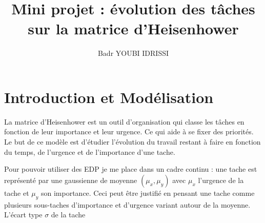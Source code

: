 \documentclass[french]{article}
\author{Badr YOUBI IDRISSI}
\title{Mini projet : évolution des tâches sur la matrice d'Heisenhower}
\begin{document}
\maketitle
\section{Introduction et Modélisation}

    La matrice d'Heisenhower est un outil d'organisation qui classe les tâches en fonction de leur 
    importance et leur urgence. Ce qui aide à se fixer des priorités. Le but de ce modèle est d'étudier
    l'évolution du travail restant à faire en fonction du temps, de l'urgence et de l'importance d'une tache.
    
    Pour pouvoir utiliser des EDP je me place dans un cadre continu : une tache est représenté par 
    une gaussienne de moyenne $(\mu_x,\mu_y)$ avec $\mu_x$ l'urgence de la tache et $\mu_y$ son importance.
    Ceci peut être justifié en pensant une tache comme plusieurs sous-taches d'importance et d'urgence variant
    autour de la moyenne. L'écart type $\sigma$ de la tache 
\end{document}
